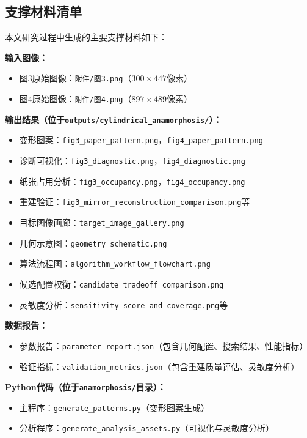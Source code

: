 \documentclass[withoutpreface]{cumcmthesis}
\begin{document}
\begin{appendices}


\section{支撑材料清单}

本文研究过程中生成的主要支撑材料如下：

\textbf{输入图像：}
\begin{itemize}
    \item 图3原始图像：\texttt{附件/图3.png}（$300\times447$像素）
    \item 图4原始图像：\texttt{附件/图4.png}（$897\times489$像素）
\end{itemize}

\textbf{输出结果（位于\texttt{outputs/cylindrical\_anamorphosis/}）：}
\begin{itemize}
    \item 变形图案：\texttt{fig3\_paper\_pattern.png}，\texttt{fig4\_paper\_pattern.png}
    \item 诊断可视化：\texttt{fig3\_diagnostic.png}，\texttt{fig4\_diagnostic.png}
    \item 纸张占用分析：\texttt{fig3\_occupancy.png}，\texttt{fig4\_occupancy.png}
    \item 重建验证：\texttt{fig3\_mirror\_reconstruction\_comparison.png}等
    \item 目标图像画廊：\texttt{target\_image\_gallery.png}
    \item 几何示意图：\texttt{geometry\_schematic.png}
    \item 算法流程图：\texttt{algorithm\_workflow\_flowchart.png}
    \item 候选配置权衡：\texttt{candidate\_tradeoff\_comparison.png}
    \item 灵敏度分析：\texttt{sensitivity\_score\_and\_coverage.png}等
\end{itemize}

\textbf{数据报告：}
\begin{itemize}
    \item 参数报告：\texttt{parameter\_report.json}（包含几何配置、搜索结果、性能指标）
    \item 验证指标：\texttt{validation\_metrics.json}（包含重建质量评估、灵敏度分析）
\end{itemize}

\textbf{Python代码（位于\texttt{anamorphosis/}目录）：}
\begin{itemize}
    \item 主程序：\texttt{generate\_patterns.py}（变形图案生成）
    \item 分析程序：\texttt{generate\_analysis\_assets.py}（可视化与灵敏度分析）
\end{itemize}

\end{appendices}
\end{document}
